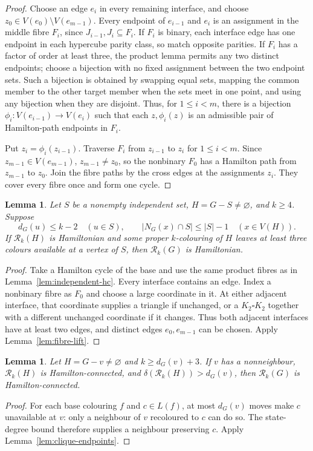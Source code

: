 \documentclass[11pt]{article}
\newtheorem{lemma}[theorem]{Lemma}
\theoremstyle{remark}
\newcommand{\Rk}{\mathcal R_k}
\numberwithin{equation}{section}
\numberwithin{table}{section}
\begin{document}
\begin{proof}
Choose an edge $e_i$ in every remaining interface, and choose
$z_0\in V(e_0)\setminus V(e_{m-1})$.  Every endpoint of
$e_{i-1}$ and $e_i$ is an assignment in the middle fibre $F_i$, since
$J_{i-1},J_i\subseteq F_i$.  If $F_i$ is binary, each interface edge
has one endpoint in each hypercube parity class, so match opposite
parities.  If $F_i$ has a factor of order at least three, the product
lemma permits any two distinct endpoints; choose a bijection with no
fixed assignment between the two endpoint sets.  Such a
bijection is obtained by swapping equal sets, mapping the common member
to the other target member when the sets meet in one point, and using any
bijection when they are disjoint.  Thus, for $1\le i<m$, there is a
bijection $\phi_i:V(e_{i-1})\to V(e_i)$ such that each
$z,\phi_i(z)$ is an admissible pair of Hamilton-path endpoints in
$F_i$.

Put $z_i=\phi_i(z_{i-1})$.  Traverse $F_i$ from $z_{i-1}$ to $z_i$
for $1\le i<m$.  Since $z_{m-1}\in V(e_{m-1})$,
$z_{m-1}\ne z_0$, so the nonbinary $F_0$ has a Hamilton path from
$z_{m-1}$ to $z_0$.  Join the fibre paths by the cross edges at the
assignments $z_i$.  They cover every fibre once and form one cycle.
\end{proof}

\begin{lemma}
\label{lem:independent-restoration}
Let $S$ be a nonempty independent set, $H=G-S\ne\varnothing$, and
$k\ge4$.  Suppose
\[
 d_G(u)\le k-2\quad(u\in S),\qquad
 |N_G(x)\cap S|\le |S|-1\quad(x\in V(H)).
\]
If $\Rk(H)$ is Hamiltonian and some proper $k$-colouring of $H$ leaves
at least three colours available at a vertex of $S$, then $\Rk(G)$ is
Hamiltonian.
\end{lemma}

\begin{proof}
Take a Hamilton cycle of the base and use the same product fibres as in
Lemma~\ref{lem:independent-hc}.  Every interface contains an edge.
Index a nonbinary fibre as $F_0$ and choose a large coordinate in it.
At either adjacent interface, that coordinate supplies a triangle if
unchanged, or a $K_2\square K_2$ together with a different unchanged
coordinate if it changes.  Thus both adjacent interfaces have at least
two edges, and distinct edges $e_0,e_{m-1}$ can be chosen.  Apply
Lemma~\ref{lem:fibre-lift}.
\end{proof}

\begin{lemma}\label{lem:single-hc}
Let $H=G-v\ne\varnothing$ and $k\ge d_G(v)+3$.
If $v$ has a nonneighbour, $\Rk(H)$ is Hamilton-connected, and
$\delta(\Rk(H))>d_G(v)$, then $\Rk(G)$ is Hamilton-connected.
\end{lemma}
\begin{proof}
For each base colouring $f$ and $c\in L(f)$, at most $d_G(v)$
moves make $c$ unavailable at $v$: only a neighbour of $v$
recoloured to $c$ can do so. The state-degree bound therefore
supplies a neighbour preserving $c$.
Apply Lemma~\ref{lem:clique-endpoints}.
\end{proof}
\end{document}
